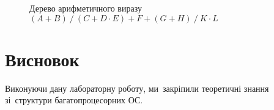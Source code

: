 \documentclass[
	a4paper,
	oneside,
	BCOR = 10mm,
	DIV = 12,
	12pt,
	headings = normal,
]{scrartcl}
\begin{document}
\begin{figure}[!htbp]
\begin{tikzpicture}[]
			\end{tikzpicture}
			\caption{Дерево арифметичного виразу $(A + B) \mathbin{/} (C + D \cdot E) + F + (G + H) \mathbin{/} K \cdot L$}
			\label{fig:expression-tree}
		\end{figure}

	\section{Висновок}
		Виконуючи дану лабораторну роботу, ми~закріпили теоретичні знання зі~структури багатопроцесорних ОС. 
\end{document}
